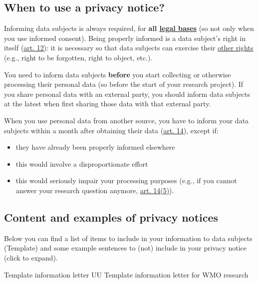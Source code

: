 \documentclass[
]{book}
\providecommand{\tightlist}{%
  \setlength{\itemsep}{0pt}\setlength{\parskip}{0pt}}
\begin{document}
\hypertarget{when-to-use-a-privacy-notice}{%
\subsection{When to use a privacy notice?}\label{when-to-use-a-privacy-notice}}

Informing data subjects is always required, for \textbf{all \protect\hyperlink{legal-basis}{legal bases}}
(so not only when you use informed consent). Being properly informed is a data
subject's right in itself (\href{https://gdpr-info.eu/art-12-gdpr/}{art. 12}):
it is necessary so that data subjects can exercise their \protect\hyperlink{data-subject-rights}{other rights}
(e.g., right to be forgotten, right to object, etc.).

You need to inform data subjects \textbf{before} you start collecting or otherwise
processing their personal data (so before the start of your research project).
If you share personal data with an external party, you should inform data
subjects at the latest when first sharing those data with that external party.

When you use personal data from another source, you have to inform your data
subjects within a month after obtaining their data
(\href{https://gdpr-info.eu/art-14-gdpr/}{art. 14}), except if:

\begin{itemize}
\tightlist
\item
  they have already been properly informed elsewhere
\item
  this would involve a disproportionate effort
\item
  this would seriously impair your processing purposes (e.g., if you cannot
  answer your research question anymore,
  \href{https://gdpr-info.eu/art-14-gdpr/}{art. 14(5)}).
\end{itemize}

\hypertarget{content-and-examples-of-privacy-notices}{%
\subsection{Content and examples of privacy notices}\label{content-and-examples-of-privacy-notices}}

Below you can find a list of items to include in your information to data
subjects (Template) and some example sentences to (not) include in your privacy
notice (click to expand).

Template information letter UU
Template information letter for WMO research
\end{document}
